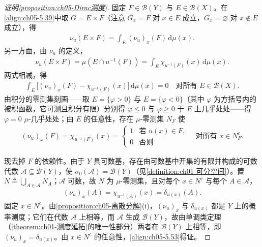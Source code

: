 \documentclass[../../main.tex]{subfiles}%
\begin{document}
\begin{proof}[证明\cref{proposition:ch05-Dirac测度}]
固定 $F\in\mathscr{B}(Y)$ 与 $E\in\mathscr{B}(X)$。在\eqref{align:ch05-5.39}中取 $G=E\times F$（注意 $G_x=F$ 对 $x\in E$ 成立，$G_x=\varnothing$ 对 $x\notin E$ 成立），得
\begin{align*}
\nu_u(E\times F)=\int_E(\nu_u)_x(F)\,\mathrm{d}\mu(x).
\end{align*}
另一方面，由 $\nu_u$ 的定义，
\begin{align*}
\nu_u(E\times F)=\mu(E\cap u^{-1}(F))=\int_E\chi_{u^{-1}(F)}(x)\,\mathrm{d}\mu(x).
\end{align*}
两式相减，得
\begin{align*}
\int_E\bigl[(\nu_u)_x(F)-\chi_{u^{-1}(F)}(x)\bigr]\,\mathrm{d}\mu(x)=0
\quad\text{对所有 }E\in\mathscr{B}(X).
\end{align*}
由积分的零测集刻画——取 $E=\{\varphi>0\}$ 与 $E=\{\varphi<0\}$（其中 $\varphi$ 为方括号内的被积函数，它可测且积分有限）分别得 $\varphi\leqslant0$ 与 $\varphi\geqslant0$ 于 $E$ 上几乎处处——得 $\varphi=0$ $\mu$-几乎处处；由 $E$ 的任意性，存在 $\mu$-零测集 $N_F$ 使
\begin{align*}
(\nu_u)_x(F)=\chi_{u^{-1}(F)}(x)=
\begin{cases}
1 & \text{若 }u(x)\in F,\\
0 & \text{否则}
\end{cases}
\quad\text{对所有 }x\in N_F^c.
\end{align*}

现去掉 $F$ 的依赖性。由于 $Y$ 具可数基，存在由可数基中开集的有限并构成的可数代数 $\mathcal{A}\subseteq\mathscr{B}(Y)$，使 $\sigma_0(\mathcal{A})=\mathscr{B}(Y)$（见\cref{definition:ch01-可分空间}）。置 $N\triangleq\bigcup_{A\in\mathcal{A}}N_A$；$\mathcal{A}$ 可数，故 $N$ 为 $\mu$-零测集，且对每个 $x\in N^c$ 与每个 $A\in\mathcal{A}$，
\begin{align*}
(\nu_u)_x(A)=\chi_{u^{-1}(A)}(x)=\delta_{u(x)}(A).
\end{align*}
固定 $x\in N^c$。由\cref{proposition:ch05-离散分解}(i)，$(\nu_u)_x$ 与 $\delta_{u(x)}$ 都是 $Y$ 上的概率测度；它们在代数 $\mathcal{A}$ 上相等，而 $\mathcal{A}$ 生成 $\mathscr{B}(Y)$，故由单调类定理（\cref{theorem:ch01-测度延拓}的唯一性部分）两者在 $\mathscr{B}(Y)$ 上相等，即 $(\nu_u)_x=\delta_{u(x)}$。由 $x\in N^c$ 的任意性，\eqref{align:ch05-5.53}得证。
\end{proof}
\end{document}
